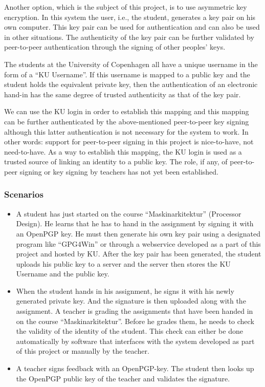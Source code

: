 \documentclass[11pt,a4paper]{report}
\begin{document}
Another option, which is the subject of this project, is to use asymmetric key encryption. In this system the user, i.e., the student, generates a key pair on his own computer. This key pair can be used for authentication and can also be used in other situations. The authenticity of the key pair can be further validated by peer-to-peer authentication through the signing of other peoples' keys.

The students at the University of Copenhagen all have a unique username in the form of a ``KU Username''. If this username is mapped to a public key and the student holds the equivalent private key, then the authentication of an electronic hand-in has the same degree of trusted authenticity as that of the key pair.

We can use the KU login in order to establish this mapping and this mapping can be further authenticated by the above-mentioned peer-to-peer key signing although this latter authentication is not necessary for the system to work. In other words: support for peer-to-peer signing in this project is nice-to-have, not need-to-have. As a way to establish this mapping, the KU login is used as a trusted source of linking an identity to a public key. The role, if any, of peer-to-peer signing or key signing by teachers has not yet been established.


\subsubsection{Scenarios}
\begin{itemize}
\item A student has just started on the course ``Maskinarkitektur'' (Processor Design). He learns that he has to hand in the assignment by signing it with an OpenPGP key. He must then generate his own key pair using a designated program like ``GPG4Win'' or through a webservice developed as a part of this project and hosted by KU. After the key pair has been generated, the student uploads his public key to a server and the server then stores the KU Username and the public key.
\item When the student hands in his assignment, he signs it with his newly generated private key. And the signature is then uploaded along with the assignment. A teacher is grading the assignments that have been handed in on the course ``Maskinarkitektur''. Before he grades them, he needs to check the validity of the identity of the student. This check can either be done automatically by software that interfaces with the system developed as part of this project or manually by the teacher.
\item A teacher signs feedback with an OpenPGP-key. The student then looks up the OpenPGP public key of the teacher and validates the signature.
\end{itemize}
\end{document}
